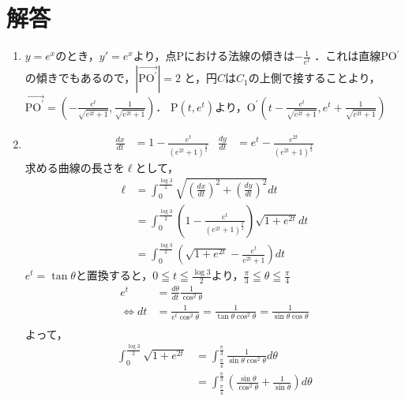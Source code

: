 \documentclass[a3paper,twocolumn,fleqn]{ltjsarticle}
\begin{document}
\section{解答}
\begin{enumerate}[(1)]
    \item $y=e^x$のとき，$y'=e^x$より，点Pにおける法線の傾きは$\displaystyle -\frac{1}{e^t}$ ．これは直線PO$^\prime$の傾きでもあるので，$\left| \overrightarrow{\mbox{PO}^\prime} \right| = 2$ と，円$C$は$C_1$の上側で接することより，\\
    $\displaystyle \overrightarrow{\mbox{PO}^\prime} = \left( -\frac{e^t}{\sqrt{e^{2t}+1}} , \frac{1}{\sqrt{e^{2t}+1}}\right)$．
    P$(t,e^t)$より，$\displaystyle \mbox{O}^\prime \left( t - \frac{e^t}{\sqrt{e^{2t}+1}} , e^t + \frac{1}{\sqrt{e^{2t}+1}}\right)$\\
    \item 
    \begin{align*}
        \frac{dx}{dt} &= 1-\frac{e^t}{{\left( e^{2t}+1 \right)}^\frac{3}{2}} & \frac{dy}{dt} &= e^t - \frac{e^{2t}}{{\left( e^{2t}+1 \right)}^\frac{3}{2}}
    \end{align*}
    求める曲線の長さを$\ell$として，
    \begin{align*}
        \ell &= \int_{0}^{\frac{\log3}{2}}\sqrt{\left( \frac{dx}{dt} \right)^2 + \left( \frac{dy}{dt} \right)^2} dt\\
        &= \int_{0}^{\frac{\log3}{2}} \left(1 - \frac{e^t}{\left(e^{2t} + 1\right)^\frac{3}{2}}\right)\sqrt{1+e^{2t}} dt\\
        &= \int_{0}^{\frac{\log3}{2}} \left(\sqrt{1+e^{2t}} - \frac{e^t}{e^{2t} + 1}\right) dt
    \end{align*}
    $e^t = \tan\theta$と置換すると，$\displaystyle 0\leqq t\leqq \frac{\log3}{2} $より，$\displaystyle \frac{\pi}{3} \leqq\theta\leqq\frac{\pi}{4}$
    \begin{align*}
        e^t &= \frac{d\theta}{dt}\frac{1}{\cos^2\theta}\\
        \Leftrightarrow dt &= \frac{1}{e^t \cos^2\theta} = \frac{1}{\tan\theta\cos^2\theta}= \frac{1}{\sin\theta\cos\theta}\\
    \end{align*}
    よって，
    \begin{align*}
        \int_{0}^{\frac{\log3}{2}} \sqrt{1+e^{2t}} &= \int^{\frac{\pi}{3}}_{\frac{\pi}{4}} \frac{1}{\sin\theta \cos^2\theta} d\theta\\
        &= \int^{\frac{\pi}{3}}_{\frac{\pi}{4}} \left(\frac{\sin\theta}{\cos^2\theta} + \frac{1}{\sin\theta}\right) d\theta\\

\end{align*}
\end{enumerate}
\end{document}
